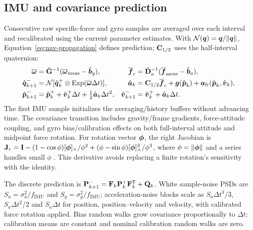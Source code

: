 \subsection{IMU and covariance prediction}
Consecutive raw specific-force and gyro samples are averaged over each interval and recalibrated using the current parameter estimates. With $\mathcal N(\boldsymbol{q})=\boldsymbol{q}/\lVert\boldsymbol{q}\rVert$, Equation~\eqref{eq:nav-propagation} defines prediction; $\mathbf{C}_{1/2}$ uses the half-interval quaternion:
\begin{equation}
\begin{aligned}
 \overline{\boldsymbol{\omega}}&=\hat{\mathbf{G}}^{-1}(\overline{\boldsymbol{\omega}}_{\mathrm{meas}}-\hat{\boldsymbol{b}}_g),&
 \overline{\boldsymbol{f}}_c&=\hat{\mathbf{D}}_a^{-1}(\overline{\boldsymbol{f}}_{\mathrm{meas}}-\hat{\boldsymbol{b}}_a),\\
 \hat{\boldsymbol{q}}_{k+1}^{-}&=\mathcal N[\hat{\boldsymbol{q}}_{k}^{+}\otimes\operatorname{Exp}(\overline{\boldsymbol{\omega}}\Delta t)],&
 \hat{\boldsymbol{a}}_{k}&=\mathbf{C}_{1/2}\overline{\boldsymbol{f}}_c+\boldsymbol{g}(\hat{\boldsymbol{p}}_k)+\boldsymbol{a}_{\mathrm{fr}}(\hat{\boldsymbol{p}}_k,\hat{\boldsymbol{v}}_k),\\
 \hat{\boldsymbol{p}}_{k+1}^{-}&=\hat{\boldsymbol{p}}_k^{+}+\hat{\boldsymbol{v}}_k^{+}\Delta t+\tfrac12\hat{\boldsymbol{a}}_k\Delta t^2,&
 \hat{\boldsymbol{v}}_{k+1}^{-}&=\hat{\boldsymbol{v}}_k^{+}+\hat{\boldsymbol{a}}_k\Delta t.
\end{aligned}
\label{eq:nav-propagation}
\end{equation}
The first IMU sample initializes the averaging/history buffers without advancing time. The covariance transition includes gravity/frame gradients, force-attitude coupling, and gyro bias/calibration effects on both full-interval attitude and midpoint force rotation. For rotation vector $\boldsymbol{\phi}$, the right Jacobian is $\mathbf{J}_r=\mathbf{I}-(1-\cos\phi)[\boldsymbol{\phi}]_\times/\phi^2+(\phi-\sin\phi)[\boldsymbol{\phi}]_\times^2/\phi^3$, where $\phi=\lVert\boldsymbol{\phi}\rVert$ and a series handles small $\phi$ \cite{sola2017}. This derivative avoids replacing a finite rotation's sensitivity with the identity.

The discrete prediction is $\mathbf{P}^-_{k+1}=\mathbf{F}_k\mathbf{P}_k^+\mathbf{F}_k^{\mathsf T}+\mathbf{Q}_k$. White sample-noise PSDs are $S_a=\sigma_a^2/f_{\mathrm{IMU}}$ and $S_g=\sigma_g^2/f_{\mathrm{IMU}}$; acceleration-noise blocks scale as $S_a\Delta t^3/3$, $S_a\Delta t^2/2$ and $S_a\Delta t$ for position, position--velocity and velocity, with calibrated force rotation applied. Bias random walks grow covariance proportionally to $\Delta t$; calibration means are constant and nominal calibration random walks are zero.

